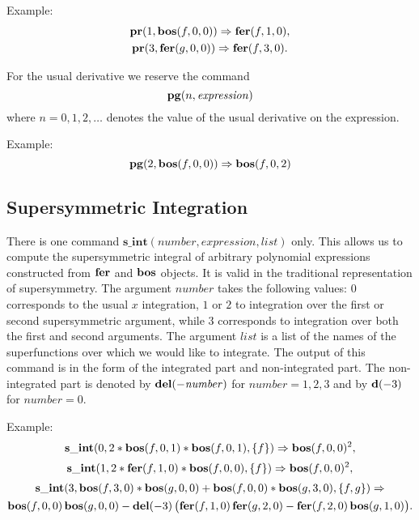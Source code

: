 {Example:
\begin{gather*}
  \mathbf{pr}(1,\mathbf{bos}(f,0,0)) \Rightarrow \mathbf{fer}(f,1,0), \\
  \mathbf{pr}(3,\mathbf{fer}(g,0,0)) \Rightarrow \mathbf{fer}(f,3,0).
\end{gather*}

For the usual derivative we reserve the command
\begin{equation*}
  \mathbf{pg}(n,\mathit{expression})
\end{equation*}
where $n=0,1,2,\ldots$ denotes the value of the usual derivative on
the expression.

Example:
\begin{equation*}
  \mathbf{pg}(2,\mathbf{bos}(f,0,0)) \Rightarrow \mathbf{bos}(f,0,2)
\end{equation*}

\subsection{Supersymmetric Integration}

There is one command
$\mathbf{s\_int}(\mathit{number},\mathit{expression},\mathit{list})$
only.  This allows us to compute the supersymmetric integral of
arbitrary polynomial expressions constructed from $\mathbf{fer}$ and $\mathbf{bos}$
objects.  It is valid in the traditional representation of
supersymmetry.  The argument $number$ takes the following values: $0$
corresponds to the usual $x$ integration, $1$ or $2$ to integration
over the first or second supersymmetric argument, while $3$
corresponds to integration over both the first and second arguments.
The argument $list$ is a list of the names of the superfunctions over
which we would like to integrate.  The output of this command is in
the form of the integrated part and non-integrated part.  The
non-integrated part is denoted by $\mathbf{del}(-\mathit{number})$ for
$\mathit{number} = 1,2,3$ and by $\mathbf{d}(-3)$ for $\mathit{number} = 0$.

Example:
\begin{equation*}
  \mathbf{s\_int}(0,2*\mathbf{bos}(f,0,1)*\mathbf{bos}(f,0,1),\{f\}) \Rightarrow \mathbf{bos}(f,0,0)^{2},
\end{equation*}
\begin{equation*}
  \mathbf{s\_int}(1,2*\mathbf{fer}(f,1,0)*\mathbf{bos}(f,0,0),\{f\}) \Rightarrow \mathbf{bos}(f,0,0)^{2},
\end{equation*}
\begin{multline*}
\mathbf{s\_int}(3,\mathbf{bos}(f,3,0)*\mathbf{bos}(g,0,0)+\mathbf{bos}(f,0,0)*\mathbf{bos}(g,3,0),\{f,g\}) \Rightarrow \\
\mathbf{bos}(f,0,0)\,\mathbf{bos}(g,0,0) - \mathbf{del}(-3)\,\big( \mathbf{fer}(f,1,0)\,\mathbf{fer}(g,2,0) - \mathbf{fer}(f,2,0)\,\mathbf{bos}(g,1,0) \big).
\end{multline*}

}
